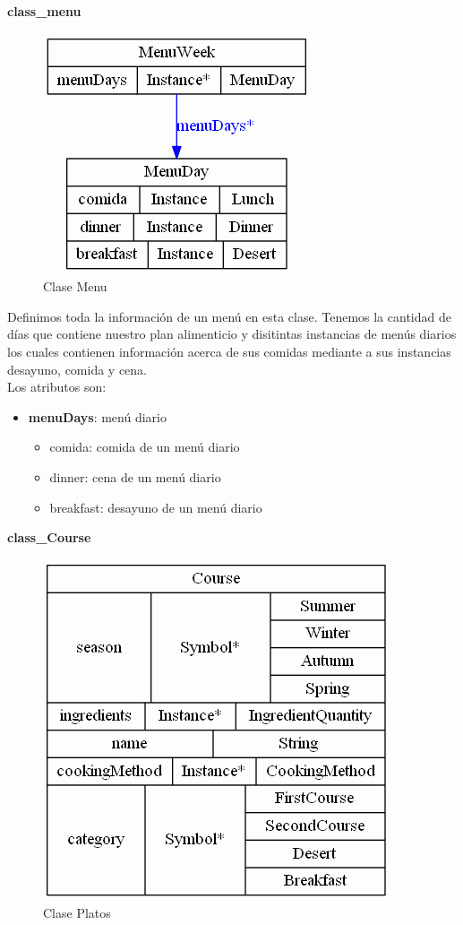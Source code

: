 \documentclass[12]{article}
\begin{document}
\textbf{class\_menu}
\begin{figure}[H]
\centering
\includegraphics[scale=0.5]{images/classMenu.png}
\caption{Clase Menu}
\label{menu}
\end{figure}

Definimos toda la información de un menú en esta clase. Tenemos la cantidad de días que contiene nuestro plan alimenticio y disitintas instancias de menús diarios los cuales contienen información acerca de sus comidas mediante a sus instancias desayuno, comida y cena. 
\\

Los atributos son: 
\begin{itemize}
\item \textbf{menuDays}: menú diario
	\begin{itemize}
	\item comida: comida de un menú diario
	\item dinner: cena de un menú diario
	\item breakfast: desayuno de un menú diario
	\end{itemize}
\end{itemize}

\vspace{0.5cm}

\textbf{class\_Course}
\begin{figure}[H]
\centering
\includegraphics[scale=0.5]{images/classCourse.png}
\caption{Clase Platos}
\label{platos}
\end{figure}
\end{document}
